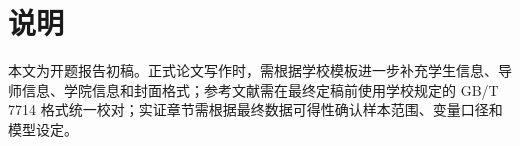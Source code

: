 \documentclass[UTF8,a4paper,zihao=-4,fontset=windows]{ctexart}
\begin{document}
\section*{说明}

本文为开题报告初稿。正式论文写作时，需根据学校模板进一步补充学生信息、导师信息、学院信息和封面格式；参考文献需在最终定稿前使用学校规定的 GB/T 7714 格式统一校对；实证章节需根据最终数据可得性确认样本范围、变量口径和模型设定。
\end{document}
